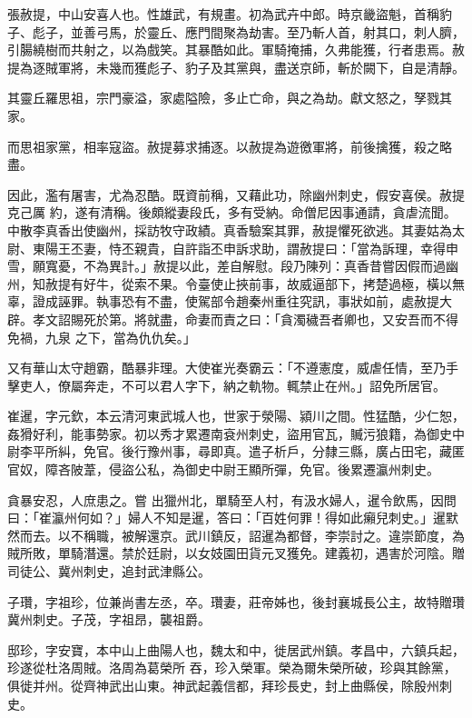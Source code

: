 \begin{pinyinscope}
 張赦提，中山安喜人也。性雄武，有規畫。初為武卉中郎。時京畿盜魁，首稱豹子、彪子，並善弓馬，於靈丘、應門間聚為劫害。至乃斬人首，射其口，刺人臍，引腸繞樹而共射之，以為戲笑。其暴酷如此。軍騎掩捕，久弗能獲，行者患焉。赦提為逐賊軍將，未幾而獲彪子、豹子及其黨與，盡送京師，斬於闕下，自是清靜。



 其靈丘羅思祖，宗門豪溢，家處隘險，多止亡命，與之為劫。獻文怒之，孥戮其家。



 而思祖家黨，相率寇盜。赦提募求捕逐。以赦提為遊徼軍將，前後擒獲，殺之略盡。



 因此，濫有屠害，尤為忍酷。既資前稱，又藉此功，除幽州刺史，假安喜侯。赦提克己厲
 約，遂有清稱。後頗縱妻段氏，多有受納。命僧尼因事通請，貪虐流聞。中散李真香出使幽州，採訪牧守政績。真香驗案其罪，赦提懼死欲逃。其妻姑為太尉、東陽王丕妻，恃丕親貴，自許詣丕申訴求助，謂赦提曰：「當為訴理，幸得申雪，願寬憂，不為異計。」赦提以此，差自解慰。段乃陳列：真香昔嘗因假而過幽州，知赦提有好牛，從索不果。令臺使止挾前事，故威逼部下，拷楚過極，橫以無辜，證成誣罪。執事恐有不盡，使駕部令趙秦州重往究訊，事狀如前，處赦提大辟。孝文詔賜死於第。將就盡，命妻而責之曰：「貪濁穢吾者卿也，又安吾而不得免禍，九泉
 之下，當為仇仇矣。」



 又有華山太守趙霸，酷暴非理。大使崔光奏霸云：「不遵憲度，威虐任情，至乃手擊吏人，僚屬奔走，不可以君人字下，納之軌物。輒禁止在州。」詔免所居官。



 崔暹，字元欽，本云清河東武城人也，世家于滎陽、潁川之間。性猛酷，少仁恕，姦猾好利，能事勢家。初以秀才累遷南袞州刺史，盜用官瓦，贓污狼籍，為御史中尉李平所糾，免官。後行豫州事，尋即真。遣子析戶，分隸三縣，廣占田宅，藏匿官奴，障吝陂葦，侵盜公私，為御史中尉王顯所彈，免官。後累遷瀛州刺史。



 貪暴安忍，人庶患之。嘗
 出獵州北，單騎至人村，有汲水婦人，暹令飲馬，因問曰：「崔瀛州何如？」婦人不知是暹，答曰：「百姓何罪！得如此癩兒刺史。」暹默然而去。以不稱職，被解還京。武川鎮反，詔暹為都督，李崇討之。違崇節度，為賊所敗，單騎潛還。禁於廷尉，以女妓園田貨元叉獲免。建義初，遇害於河陰。贈司徒公、冀州刺史，追封武津縣公。



 子瓚，字祖珍，位兼尚書左丞，卒。瓚妻，莊帝姊也，後封襄城長公主，故特贈瓚冀州刺史。子茂，字祖昂，襲祖爵。



 邸珍，字安寶，本中山上曲陽人也，魏太和中，徙居武州鎮。孝昌中，六鎮兵起，珍遂從杜洛周賊。洛周為葛榮所
 吞，珍入榮軍。榮為爾朱榮所破，珍與其餘黨，俱徙并州。從齊神武出山東。神武起義信都，拜珍長史，封上曲縣侯，除殷州刺史。




\end{pinyinscope}
